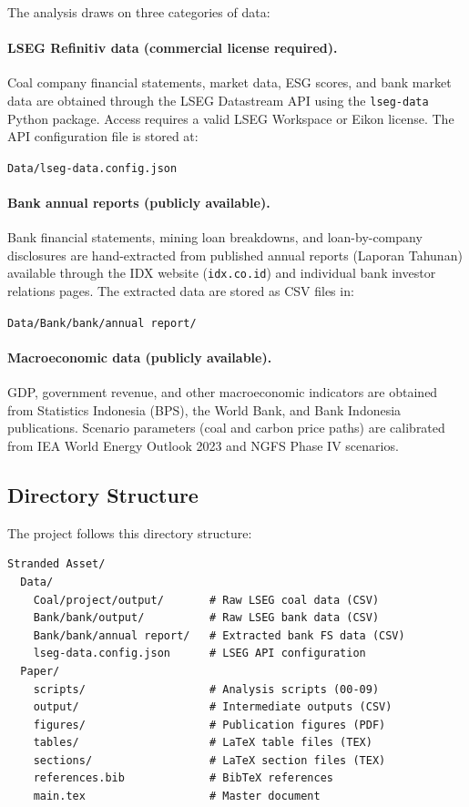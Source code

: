 The analysis draws on three categories of data:

\paragraph{LSEG Refinitiv data (commercial license required).} Coal company financial statements, market data, ESG scores, and bank market data are obtained through the LSEG Datastream API using the \texttt{lseg-data} Python package. Access requires a valid LSEG Workspace or Eikon license. The API configuration file is stored at:

\smallskip
\noindent\texttt{Data/lseg-data.config.json}

\paragraph{Bank annual reports (publicly available).} Bank financial statements, mining loan breakdowns, and loan-by-company disclosures are hand-extracted from published annual reports (Laporan Tahunan) available through the IDX website (\texttt{idx.co.id}) and individual bank investor relations pages. The extracted data are stored as CSV files in:

\smallskip
\noindent\texttt{Data/Bank/bank/annual report/}

\paragraph{Macroeconomic data (publicly available).} GDP, government revenue, and other macroeconomic indicators are obtained from Statistics Indonesia (BPS), the World Bank, and Bank Indonesia publications. Scenario parameters (coal and carbon price paths) are calibrated from IEA World Energy Outlook 2023 and NGFS Phase IV scenarios.


\subsection{Directory Structure}
\label{subsec:directory}

The project follows this directory structure:

\begin{small}
\begin{verbatim}
Stranded Asset/
  Data/
    Coal/project/output/       # Raw LSEG coal data (CSV)
    Bank/bank/output/          # Raw LSEG bank data (CSV)
    Bank/bank/annual report/   # Extracted bank FS data (CSV)
    lseg-data.config.json      # LSEG API configuration
  Paper/
    scripts/                   # Analysis scripts (00-09)
    output/                    # Intermediate outputs (CSV)
    figures/                   # Publication figures (PDF)
    tables/                    # LaTeX table files (TEX)
    sections/                  # LaTeX section files (TEX)
    references.bib             # BibTeX references
    main.tex                   # Master document
\end{verbatim}
\end{small}


